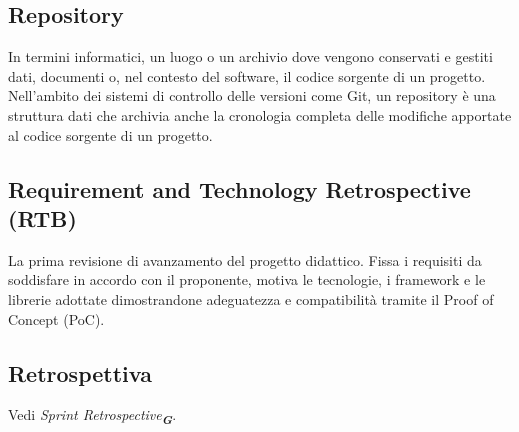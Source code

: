 \subsection*{Repository}
In termini informatici, un luogo o un archivio dove vengono conservati e gestiti dati, documenti o, nel contesto del software, il codice sorgente di un 
progetto. Nell'ambito dei sistemi di controllo delle versioni come Git, un repository è una struttura dati che archivia anche la cronologia completa delle 
modifiche apportate al codice sorgente di un progetto.

\subsection*{Requirement and Technology Retrospective (RTB)}
La prima revisione di avanzamento del progetto didattico. Fissa i requisiti da soddisfare in accordo con il proponente, motiva le tecnologie, i framework 
e le librerie adottate dimostrandone adeguatezza e compatibilità tramite il Proof of Concept (PoC).

\subsection*{Retrospettiva}
Vedi \emph{Sprint Retrospective}\textsubscript{\textit{\textbf{G}}}.

\newpage